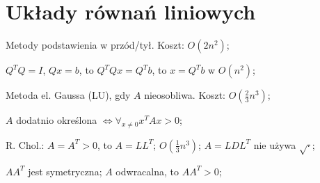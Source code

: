 \section{Układy równań liniowych}

\entry
Metody podstawienia w przód/tył. Koszt: $O(2n^2)$;

\entry
$Q^TQ=I$, $Qx=b$, to $Q^TQx=Q^Tb$, to $x=Q^Tb$ w $O(n^2)$;



\entry
Metoda el. Gaussa (LU), gdy $A$ nieosobliwa. Koszt: $O(\frac{2}{3}n^3)$;

\entry
$A$ dodatnio określona $\iff \forall_{x \neq 0} x^TAx>0$;

\entry
R. Chol.:
$A=A^T>0$,
to
$A=LL^T$;
$O(\frac{1}{3}n^3)$;
$A=LDL^T$
nie używa
$\sqrt{\cdot}$;

\entry
$AA^T$ jest symetryczna;
\entry
$A$ odwracalna, to $AA^T>0$;
